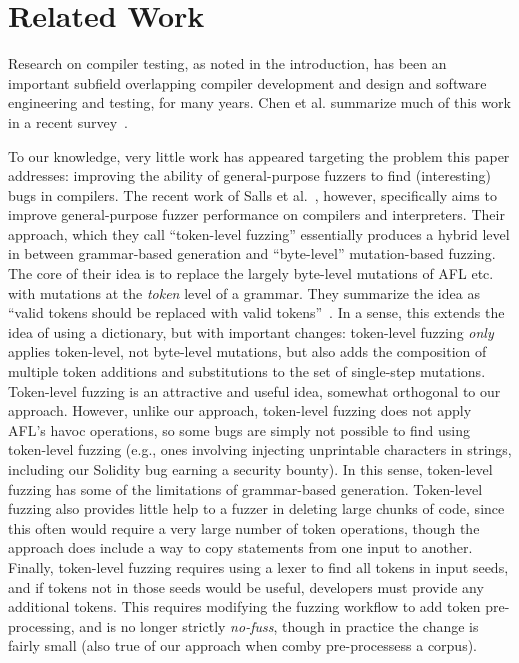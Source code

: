\section{Related Work}

Research on compiler testing, as noted in the introduction, has been an important subfield overlapping compiler development and design and software engineering and testing, for many years.  Chen et al. summarize much of this work in a recent survey~\cite{chen2020survey}.

To our knowledge, very little work has appeared targeting the problem this paper addresses: improving the ability of general-purpose fuzzers to find (interesting) bugs in compilers.  The recent work of Salls et al.~\cite{Salls2021TokenLevel}, however, specifically aims to improve general-purpose fuzzer performance on compilers and interpreters.  Their approach, which they call ``token-level fuzzing'' essentially produces a hybrid level in between grammar-based generation and ``byte-level'' mutation-based fuzzing.  The core of their idea is to replace the largely byte-level mutations of AFL etc. with mutations at the \emph{token} level of a grammar.  They summarize the idea as ``valid tokens should be replaced with valid tokens''~\cite{Salls2021TokenLevel}.  In a sense, this extends the idea of using a dictionary, but with important changes:  token-level fuzzing \emph{only} applies token-level, not byte-level mutations, but also adds the composition of multiple token additions and substitutions to the set of single-step mutations.  Token-level fuzzing is an attractive and useful idea, somewhat orthogonal to our approach.  However, unlike our approach, token-level fuzzing does not apply AFL's havoc operations, so some bugs are simply not possible to find using token-level fuzzing (e.g., ones involving injecting unprintable characters in strings, including our Solidity bug earning a security bounty).  In this sense, token-level fuzzing has some of the limitations of grammar-based generation.  Token-level fuzzing also provides little help to a fuzzer in deleting large chunks of code, since this often would require a very large number of token operations, though the approach does include a way to copy statements from one input to another.  Finally, token-level fuzzing requires using a lexer to find all tokens in input seeds, and if tokens not in those seeds would be useful, developers must provide any additional tokens.  This requires modifying the fuzzing workflow to add token pre-processing, and is no longer strictly \emph{no-fuss}, though in practice the change is fairly small (also true of our approach when comby pre-processess a corpus).